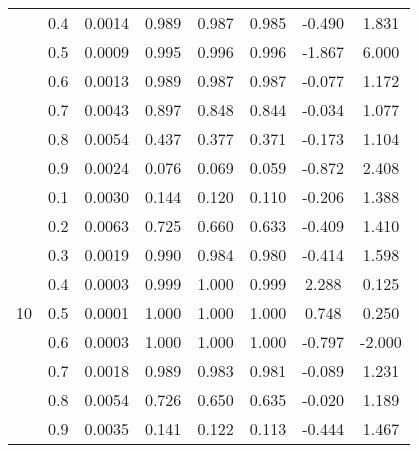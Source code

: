 \documentclass[11pt,a4paper]{report}
\begin{document}
\begin{longtable}{ | c | c || c | c | c | c | c | c | }
 & 0.4 & 0.0014 & 0.989 & 0.987 & 0.985 & -0.490 & 1.831 \\
 & 0.5 & 0.0009 & 0.995 & 0.996 & 0.996 & -1.867 & 6.000 \\
 & 0.6 & 0.0013 & 0.989 & 0.987 & 0.987 & -0.077 & 1.172 \\
 & 0.7 & 0.0043 & 0.897 & 0.848 & 0.844 & -0.034 & 1.077 \\
 & 0.8 & 0.0054 & 0.437 & 0.377 & 0.371 & -0.173 & 1.104 \\
 & 0.9 & 0.0024 & 0.076 & 0.069 & 0.059 & -0.872 & 2.408 \\
 \hline
\multirow{9}{*}{10} & 0.1 & 0.0030 & 0.144 & 0.120 & 0.110 & -0.206 & 1.388 \\
 & 0.2 & 0.0063 & 0.725 & 0.660 & 0.633 & -0.409 & 1.410 \\
 & 0.3 & 0.0019 & 0.990 & 0.984 & 0.980 & -0.414 & 1.598 \\
 & 0.4 & 0.0003 & 0.999 & 1.000 & 0.999 & 2.288 & 0.125 \\
 & 0.5 & 0.0001 & 1.000 & 1.000 & 1.000 & 0.748 & 0.250 \\
 & 0.6 & 0.0003 & 1.000 & 1.000 & 1.000 & -0.797 & -2.000 \\
 & 0.7 & 0.0018 & 0.989 & 0.983 & 0.981 & -0.089 & 1.231 \\
 & 0.8 & 0.0054 & 0.726 & 0.650 & 0.635 & -0.020 & 1.189 \\
 & 0.9 & 0.0035 & 0.141 & 0.122 & 0.113 & -0.444 & 1.467 \\
 \hline
\hline
\end{longtable}
\end{document}
